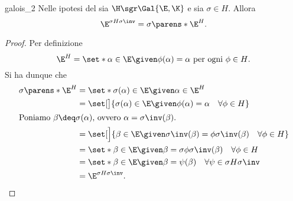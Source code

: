 \begin{lemma}
    {}{galois_2}
    Nelle ipotesi del  sia $\H \sgr \Gal{\E, \K}$ e sia $\sigma \in H$. Allora \[
        \E^{\sigma H\sigma\inv} = \sigma\parens*{\E^H}.
    \]  
\end{lemma}
\begin{proof}
    Per definizione \[
        \E^H = \set*{\alpha \in \E \given \phi(\alpha) = \alpha \text{ per ogni } \phi \in H}.
    \] Si ha dunque che \begin{align*}
        \sigma\parens*{\E^H} 
        &= \set*{\sigma(\alpha) \in \E \given \alpha \in \E^H}\\
        &= \set[\big]{\sigma(\alpha) \in \E \given \phi(\alpha) = \alpha\quad\forall \phi \in H} \\
        \intertext{Poniamo $\beta \deq \sigma(\alpha)$, ovvero $\alpha = \sigma\inv(\beta)$.}
        &= \set[\Big]{\beta \in \E \given \sigma\inv(\beta) = \phi\sigma\inv(\beta)\quad\forall\phi \in H } \\
        &= \set*{\beta \in \E \given \beta = \sigma\phi\sigma\inv(\beta) \quad\forall\phi \in H}\\
        &= \set*{\beta \in \E \given \beta = \psi(\beta)\quad\forall \psi \in \sigma H\sigma\inv}\\
        &= \E^{\sigma H\sigma\inv}. \qedhere
    \end{align*}
\end{proof}

